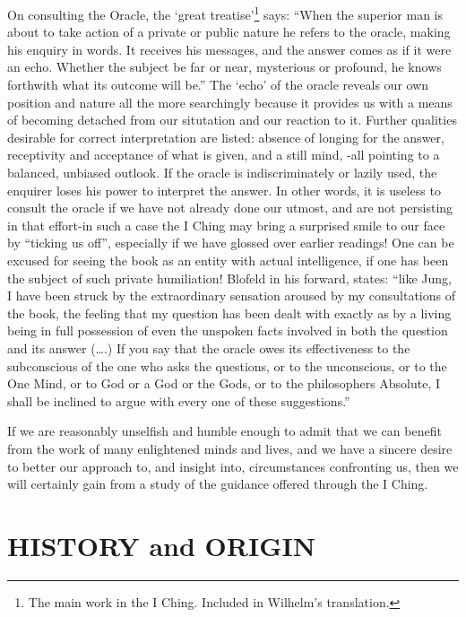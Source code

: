 \documentclass[11pt]{book}
\begin{document}
On consulting the Oracle, the `great treatise'\footnote{The main work in the I Ching. Included in Wilhelm's translation.} says: ``When the superior man is about to take action of a private or public nature he refers to the oracle, making his enquiry in words. It receives his messages, and the answer comes as if it were an echo. Whether the subject be far or near, mysterious or profound, he knows forthwith what its outcome will be.'' The `echo' of the oracle reveals our own position and nature all the more searchingly because it provides us with a means of becoming detached from our situtation and our reaction to it. Further qualities desirable for correct interpretation are listed: absence of longing for the answer, receptivity and acceptance of what is given, and a still mind, -all pointing to a balanced, unbiased outlook. If the oracle is indiscriminately or lazily used, the enquirer loses his power to interpret the answer. In other words, it is useless to consult the oracle if we have not already done our utmost, and are not persisting in that effort-in such a case the I Ching may bring a surprised smile to our face by ``ticking us off'', especially if we have glossed over earlier readings! One can be excused for seeing the book as an entity with actual intelligence, if one has been the subject of such private humiliation! Blofeld in his forward, states: ``like Jung, I have been struck by the extraordinary sensation aroused by my consultations of the book, the feeling that my question has been dealt with exactly as by a living being in full possession of even the unspoken facts involved in both the question and its answer (\ldots.) If you say that the oracle owes its effectiveness to the subconscious of the one who asks the questions, or to the unconscious, or to the One Mind, or to God or a God or the Gods, or to the philosophers Absolute, I shall be inclined to argue with every one of these suggestions.''

If we are reasonably unselfish and humble enough to admit that we can benefit from the work of many enlightened minds and lives, and we have a sincere desire to better our approach to, and insight into, circumstances confronting us, then we will certainly gain from a study of the guidance offered through the I Ching.

\hypertarget{history-and-origin}{%
\section{HISTORY and ORIGIN}\label{history-and-origin}}
\end{document}
